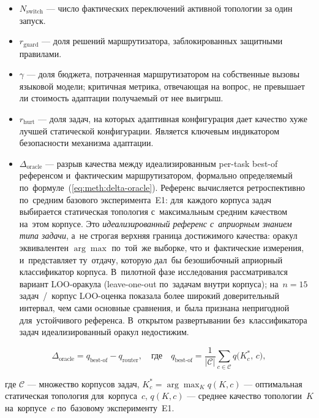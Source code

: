 \begin{itemize}[noitemsep]
  \item $N_{\text{switch}}$ --- число фактических переключений
        активной топологии за один запуск.
  \item $r_{\text{guard}}$ --- доля решений маршрутизатора,
        заблокированных защитными правилами.
  \item $\gamma$ --- доля бюджета, потраченная маршрутизатором
        на собственные вызовы языковой модели; критичная метрика,
        отвечающая на вопрос, не превышает ли стоимость адаптации
        получаемый от нее выигрыш.
  \item $r_{\text{hurt}}$ --- доля задач, на которых адаптивная
        конфигурация дает качество хуже лучшей статической
        конфигурации. Является ключевым индикатором безопасности
        механизма адаптации.
  \item $\Delta_{\text{oracle}}$ --- разрыв качества между
        идеализированным per-task best-of референсом и~фактическим
        маршрутизатором, формально определяемый
        по~формуле~(\ref{eq:meth:delta-oracle}). Референс вычисляется
        ретроспективно по~средним базового эксперимента~E1: для~каждого
        корпуса задач выбирается статическая топология с~максимальным
        средним качеством на~этом корпусе. Это \emph{идеализированный
        референс с~априорным знанием типа задачи}, а~не строгая
        верхняя граница достижимого качества: оракул эквивалентен
        $\arg\max$ по~той~же выборке, что и~фактические измерения,
        и~представляет ту~отдачу, которую дал~бы безошибочный
        априорный классификатор корпуса. В~пилотной фазе исследования
        рассматривался вариант LOO-оракула (leave-one-out по~задачам
        внутри корпуса); на~$n=15$ задач~/~корпус LOO-оценка показала
        более широкий доверительный интервал, чем сами основные
        сравнения, и~была признана непригодной для~устойчивого
        референса. В~открытом развертывании без~классификатора задач
        идеализированный оракул недостижим.
\end{itemize}

\begin{equation}
\Delta_{\text{oracle}} = q_{\text{best-of}} - q_{\text{router}},
\quad\text{где}\quad
q_{\text{best-of}} = \frac{1}{|\mathcal{C}|}
   \sum_{c \in \mathcal{C}}
      q\bigl(K^*_c,\, c \bigr),
\label{eq:meth:delta-oracle}
\end{equation}

\noindent где $\mathcal{C}$ --- множество корпусов задач,
$K^*_c = \arg\max_K q(K, c)$ --- оптимальная статическая топология
для~корпуса~$c$, $q(K, c)$ --- среднее качество топологии~$K$
на~корпусе~$c$ по~базовому эксперименту~E1.

